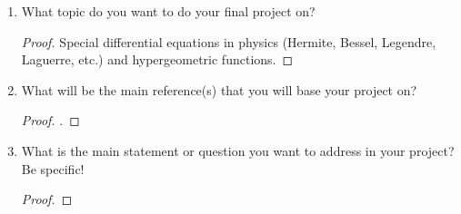 \documentclass[../finalProject.tex]{subfiles}
\begin{document}
\begin{enumerate}[label={\textbf{\arabic*.}}]
    \item {}
    What topic do you want to do your final project on?
    \begin{proof}
        Special differential equations in physics (Hermite, Bessel, Legendre, Laguerre, etc.) and hypergeometric functions.
    \end{proof}
    \item What will be the main reference(s) that you will base your project on?
    \begin{proof}
        \textcite{bib:Seaborn}.
    \end{proof}
    \item What is the main statement or question you want to address in your project? Be specific!
    \begin{proof}


\end{proof}
\end{enumerate}
\end{document}
